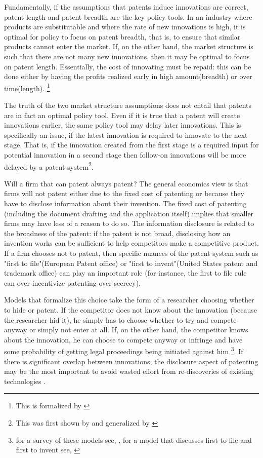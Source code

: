 Fundamentally, if the assumptions that patents induce innovations are correct, patent length and patent breadth are the key policy tools. In an industry where products are substitutable and where the rate of new innovations is high, it is optimal for policy to focus on patent breadth, that is, to ensure that similar products cannot enter the market. If, on the other hand, the market structure is such that there are not many new innovations, then it may be optimal to focus on patent length. Essentially, the cost of innovating must be repaid: this can be done either by having the profits realized early in high amount(breadth) or over time(length). \footnote{This is formalized by \cite{takalo2001optimal}}

The truth of the two market structure assumptions does not entail that patents are in fact an optimal policy tool. Even if it is true that a patent will create innovations earlier, the same policy tool may delay later innovations. This is specifically an issue, if the latest innovation is required to innovate to the next stage. That is, if the innovation created from the first stage is a required input for potential innovation in a second stage then follow-on innovations will be more delayed by a patent system\footnote{This was first shown by \cite{bessen_maskin} and generalized by \cite{Bryan2017}}.

Will a firm that can patent always patent? The general economics view is that firms will not patent either due to the fixed cost of patenting or because they have to disclose information about their invention. The fixed cost of patenting (including the document drafting and the application itself) implies that smaller firms may have less of a reason to do so. The information disclosure is related to the broadness of the patent: if the patent is not broad, disclosing how an invention works can be sufficient to help competitors make a competitive product. If a firm chooses not to patent, then specific nuances of the patent system such as "first to file"(European Patent office) or "first to invent"(United States patent and trademark office) can play an important role (for instance, the first to file rule can over-incentivize patenting over secrecy).

Models that formalize this choice take the form of a researcher choosing whether to hide or patent. If the competitor does not know about the innovation (because the researcher hid it), he simply has to choose whether to try and compete anyway or simply not enter at all. If, on the other hand, the competitor knows about the innovation, he can choose to compete anyway or infringe and have some probability of getting legal proceedings being initiated against him \footnote{for a survey of these models see, \cite{Hall2014}, for a model that discusses first to file and first to invent see, \cite{Scotchmer1990} }. If there is significant overlap between innovations, the disclosure aspect of patenting may be the most important to avoid wasted effort from re-discoveries of existing technologies \citep{Kultti2007}.  

